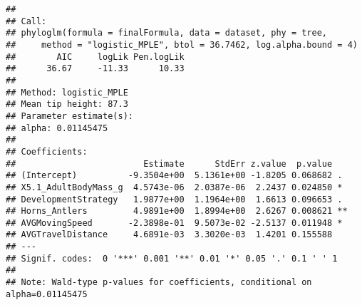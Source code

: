 \documentclass[
]{article}
\begin{document}
\begin{verbatim}
## 
## Call:
## phyloglm(formula = finalFormula, data = dataset, phy = tree, 
##     method = "logistic_MPLE", btol = 36.7462, log.alpha.bound = 4)
##        AIC     logLik Pen.logLik 
##      36.67     -11.33      10.33 
## 
## Method: logistic_MPLE
## Mean tip height: 87.3
## Parameter estimate(s):
## alpha: 0.01145475 
## 
## Coefficients:
##                         Estimate      StdErr z.value  p.value   
## (Intercept)          -9.3504e+00  5.1361e+00 -1.8205 0.068682 . 
## X5.1_AdultBodyMass_g  4.5743e-06  2.0387e-06  2.2437 0.024850 * 
## DevelopmentStrategy   1.9877e+00  1.1964e+00  1.6613 0.096653 . 
## Horns_Antlers         4.9891e+00  1.8994e+00  2.6267 0.008621 **
## AVGMovingSpeed       -2.3898e-01  9.5073e-02 -2.5137 0.011948 * 
## AVGTravelDistance     4.6891e-03  3.3020e-03  1.4201 0.155588   
## ---
## Signif. codes:  0 '***' 0.001 '**' 0.01 '*' 0.05 '.' 0.1 ' ' 1
## 
## Note: Wald-type p-values for coefficients, conditional on alpha=0.01145475
\end{verbatim}
\end{document}
